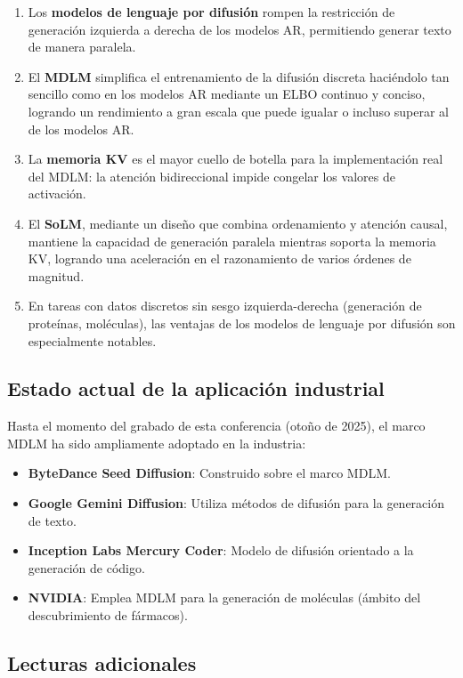 \documentclass[a4paper]{article}
\begin{document}
\begin{enumerate}
    \item Los \textbf{modelos de lenguaje por difusión} rompen la restricción de generación izquierda a derecha de los modelos AR, permitiendo generar texto de manera paralela.
    \item El \textbf{MDLM} simplifica el entrenamiento de la difusión discreta haciéndolo tan sencillo como en los modelos AR mediante un ELBO continuo y conciso, logrando un rendimiento a gran escala que puede igualar o incluso superar al de los modelos AR.
    \item La \textbf{memoria KV} es el mayor cuello de botella para la implementación real del MDLM: la atención bidireccional impide congelar los valores de activación.
    \item El \textbf{SoLM}, mediante un diseño que combina ordenamiento y atención causal, mantiene la capacidad de generación paralela mientras soporta la memoria KV, logrando una aceleración en el razonamiento de varios órdenes de magnitud.
    \item En tareas con datos discretos sin sesgo izquierda-derecha (generación de proteínas, moléculas), las ventajas de los modelos de lenguaje por difusión son especialmente notables.
\end{enumerate}

\subsection{Estado actual de la aplicación industrial}

Hasta el momento del grabado de esta conferencia (otoño de 2025), el marco MDLM ha sido ampliamente adoptado en la industria:

\begin{itemize}
    \item \textbf{ByteDance Seed Diffusion}: Construido sobre el marco MDLM.
    \item \textbf{Google Gemini Diffusion}: Utiliza métodos de difusión para la generación de texto.
    \item \textbf{Inception Labs Mercury Coder}: Modelo de difusión orientado a la generación de código.
    \item \textbf{NVIDIA}: Emplea MDLM para la generación de moléculas (ámbito del descubrimiento de fármacos).
\end{itemize}

\subsection{Lecturas adicionales}
\end{document}
